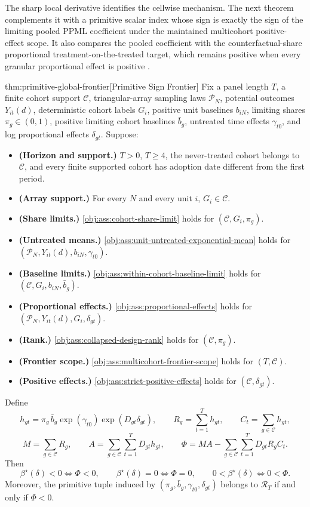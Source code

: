 \documentclass[11pt]{article}
\begin{document}
The sharp local derivative identifies the cellwise mechanism. The next theorem complements it with a primitive scalar index whose sign is exactly the sign of the limiting pooled PPML coefficient under the maintained multicohort positive-effect scope. It also compares the pooled coefficient with the counterfactual-share proportional treatment-on-the-treated target, which remains positive when every granular proportional effect is positive \citep{MoreauKastler2025PTT}.

\begin{theoremv}{thm:primitive-global-frontier}[Primitive Sign Frontier]
Fix a panel length \(T\), a finite cohort support \(\mathcal C\), triangular-array sampling laws \(\mathcal P_N\), potential outcomes \(Y_{it}(d)\), deterministic cohort labels \(G_i\), positive unit baselines \(b_{iN}\), limiting shares \(\pi_g\in(0,1)\), positive limiting cohort baselines \(\bar b_g\), untreated time effects \(\gamma_{t0}\), and log proportional effects \(\delta_{gt}\). Suppose:
\begin{itemize}
\item \textbf{(Horizon and support.)} \(T>0\), \(T\ge 4\), the never-treated cohort belongs to \(\mathcal C\), and every finite supported cohort has adoption date different from the first period.
\item \textbf{(Array support.)} For every \(N\) and every unit \(i\), \(G_i\in\mathcal C\).
\item \textbf{(Share limits.)} \cref{obj:ass:cohort-share-limit} holds for \((\mathcal C,G_i,\pi_g)\).
\item \textbf{(Untreated means.)} \cref{obj:ass:unit-untreated-exponential-mean} holds for \((\mathcal P_N,Y_{it}(d),b_{iN},\gamma_{t0})\).
\item \textbf{(Baseline limits.)} \cref{obj:ass:within-cohort-baseline-limit} holds for \((\mathcal C,G_i,b_{iN},\bar b_g)\).
\item \textbf{(Proportional effects.)} \cref{obj:ass:proportional-effects} holds for \((\mathcal P_N,Y_{it}(d),G_i,\delta_{gt})\).
\item \textbf{(Rank.)} \cref{obj:ass:collapsed-design-rank} holds for \((\mathcal C,\pi_g)\).
\item \textbf{(Frontier scope.)} \cref{obj:ass:multicohort-frontier-scope} holds for \((T,\mathcal C)\).
\item \textbf{(Positive effects.)} \cref{obj:ass:strict-positive-effects} holds for \((\mathcal C,\delta_{gt})\).
\end{itemize}
Define
\[
h_{gt}
=
\pi_g\,\bar b_g\exp(\gamma_{t0})\exp(D_{gt}\delta_{gt}),
\qquad
R_g=\sum_{t=1}^T h_{gt},
\qquad
C_t=\sum_{g\in\mathcal C} h_{gt},
\]
\[
M=\sum_{g\in\mathcal C}R_g,
\qquad
A=\sum_{g\in\mathcal C}\sum_{t=1}^T D_{gt}h_{gt},
\qquad
\Phi
=
MA-\sum_{g\in\mathcal C}\sum_{t=1}^T D_{gt}R_gC_t .
\]
Then
\[
\beta^\star(\delta)<0\iff \Phi<0,\qquad
\beta^\star(\delta)=0\iff \Phi=0,\qquad
0<\beta^\star(\delta)\iff 0<\Phi .
\]
Moreover, the primitive tuple induced by \((\pi_g,\bar b_g,\gamma_{t0},\delta_{gt})\) belongs to \(\mathcal R_T\) if and only if \(\Phi<0\).


\end{theoremv}
\end{document}
